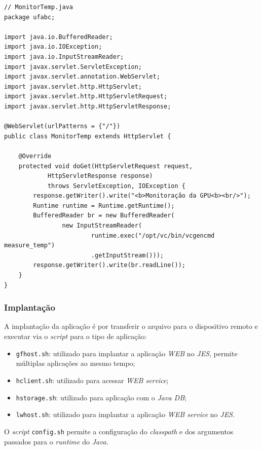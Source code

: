 \begin{verbatim}
// MonitorTemp.java
package ufabc;

import java.io.BufferedReader;
import java.io.IOException;
import java.io.InputStreamReader;
import javax.servlet.ServletException;
import javax.servlet.annotation.WebServlet;
import javax.servlet.http.HttpServlet;
import javax.servlet.http.HttpServletRequest;
import javax.servlet.http.HttpServletResponse;

@WebServlet(urlPatterns = {"/"})
public class MonitorTemp extends HttpServlet {

    @Override
    protected void doGet(HttpServletRequest request,
            HttpServletResponse response)
            throws ServletException, IOException {
        response.getWriter().write("<b>Monitoração da GPU<b><br/>");
        Runtime runtime = Runtime.getRuntime();
        BufferedReader br = new BufferedReader(
                new InputStreamReader(
                        runtime.exec("/opt/vc/bin/vcgencmd measure_temp")
                        .getInputStream()));
        response.getWriter().write(br.readLine());
    }
}
\end{verbatim}

\subsubsection{Implantação}

A implantação da aplicação é por transferir o arquivo para o dispositivo remoto
e executar via o \textit{script} para o tipo de aplicação:

\begin{itemize}

    \item \verb|gfhost.sh|: utilizado para implantar a aplicação \textit{WEB}
    no \textit{JES}, permite múltiplas aplicações ao mesmo tempo;

    \item \verb|hclient.sh|: utilizado para acessar \textit{WEB service};

    \item \verb|hstorage.sh|: utilizado para aplicação com o \textit{Java DB};

    \item \verb|lwhost.sh|: utilizado para implantar a aplicação \textit{WEB
    service} no \textit{JES}.

\end{itemize}

O \textit{script} \verb|config.sh| permite a configuração do \textit{classpath}
e dos argumentos passados para o \textit{runtime} do \textit{Java}.

